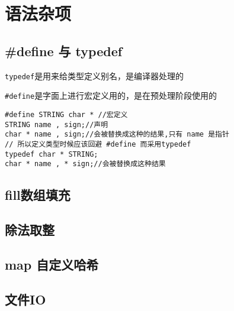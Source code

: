 \section{语法杂项}

\subsection{#define 与 typedef}
\verb|typedef|是用来给类型定义别名，是编译器处理的

\verb|#define|是字面上进行宏定义用的，是在预处理阶段使用的
\begin{lstlisting}
#define STRING char * //宏定义
STRING name , sign;//声明
char * name , sign;//会被替换成这种的结果,只有 name 是指针
// 所以定义类型时候应该回避 #define 而采用typedef
typedef char * STRING;
char * name , * sign;//会被替换成这种结果
\end{lstlisting}

\subsection{fill数组填充}


\subsection{除法取整}


\subsection{map 自定义哈希}


\subsection{文件IO}
